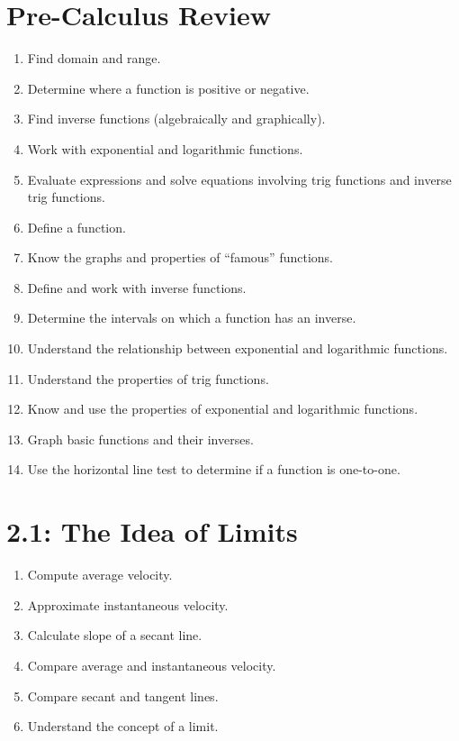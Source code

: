 \documentclass[11pt]{article}
\begin{document}
\section*{Pre-Calculus Review}
\begin{enumerate}
	\item Find domain and range.
	\item Determine where a function is positive or negative.
	\item Find inverse functions (algebraically and graphically).
	\item Work with exponential and logarithmic functions.
	\item Evaluate expressions and solve equations involving trig functions and inverse trig functions.
	\item Define a function.
	\item Know the graphs and properties of ``famous'' functions.
	\item Define and work with inverse functions.
	\item Determine the intervals on which a function has an inverse.
	\item Understand the relationship between exponential and logarithmic functions.
	\item Understand the properties of trig functions.
	\item Know and use the properties of exponential and logarithmic functions.
	\item Graph basic functions and their inverses.
	\item Use the horizontal line test to determine if a function is one-to-one.
\end{enumerate}


\section*{2.1: The Idea of Limits}
\begin{enumerate}
	\item Compute average velocity.
	\item Approximate instantaneous velocity.
	\item Calculate slope of a secant line.
	\item Compare average and instantaneous velocity.
	\item Compare secant and tangent lines.
	\item Understand the concept of a limit.
\end{enumerate}
\end{document}
